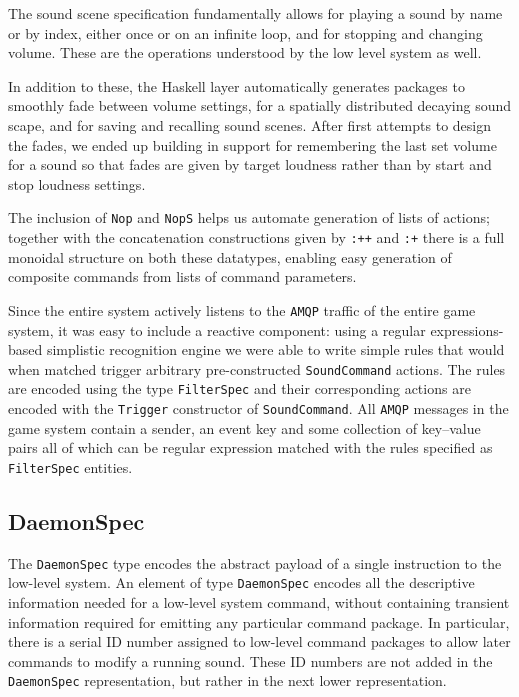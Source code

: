 The sound scene specification fundamentally allows for playing a sound
by name or by index, either once or on an infinite loop, and for
stopping and changing volume. These are the operations understood by
the low level system as well.

In addition to these, the Haskell layer automatically generates
packages to smoothly fade between volume settings, for a spatially
distributed decaying sound scape, and for saving and recalling sound
scenes. After first attempts to design the fades, we ended up building
in support for remembering the last set volume for a sound so that
fades are given by target loudness rather than by start and stop
loudness settings.

The inclusion of \texttt{Nop} and \texttt{NopS} helps us automate
generation of lists of actions; together with the concatenation
constructions given by \texttt{:++} and \texttt{:+} there is a full
monoidal structure on both these datatypes, enabling easy generation
of composite commands from lists of command parameters. 

Since the entire system actively listens to the \texttt{AMQP} traffic of the
entire game system, it was easy to include a reactive component: using
a regular expressions-based simplistic recognition engine we were able
to write simple rules that would when matched trigger arbitrary
pre-constructed \texttt{SoundCommand} actions. The rules are encoded
using the type \texttt{FilterSpec} and their corresponding actions are
encoded with the \texttt{Trigger} constructor of
\texttt{SoundCommand}. All \texttt{AMQP} messages in the game system contain a
sender, an event key and some collection of key--value pairs all of
which can be regular expression matched with the rules specified as
\texttt{FilterSpec} entities.

\subsection{DaemonSpec}
\label{sec:daemonspec}

The \texttt{DaemonSpec} type encodes the abstract payload of a single
instruction to the low-level system. An element of type
\texttt{DaemonSpec} encodes all the descriptive information needed for
a low-level system command, without containing transient information
required for emitting any particular command package. In particular,
there is a serial ID number assigned to low-level command packages to
allow later commands to modify a running sound. These ID numbers are
not added in the \texttt{DaemonSpec} representation, but rather in the
next lower representation.

